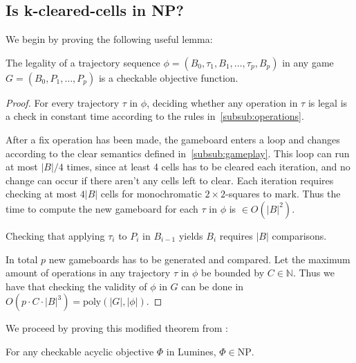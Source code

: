 \subsection{Is k-cleared-cells in NP?}

We begin by proving the following useful lemma:\\

\begin{lem}
\label{lem:legality}
The legality of a trajectory sequence $\phi=(B_0, \tau_1, B_1, \ldots ,\tau_p, B_p)$ in any game $G=(B_0, P_1, \ldots, P_p)$ is a checkable objective function.
\end{lem}

\begin{proof}
For every trajectory $\tau$ in $\phi$, deciding whether any operation in $\tau$ is legal is a check in constant time according to the rules in~\ref{subsub:operations}.

After a fix operation has been made, the gameboard enters a loop and changes according to the clear semantics defined in~\ref{subsub:gameplay}. This loop can run at most $|B| / 4$ times, since at least 4 cells has to be cleared each iteration, and no change can occur if there aren't any cells left to clear. Each iteration requires checking at most $4|B|$ cells for monochromatic $2 \times 2$-squares to mark. Thus the time to compute the new gameboard for each $\tau$ in $\phi$ is $\in O(|B|^2)$.

Checking that applying $\tau_i$ to $P_i$ in $B_{i-1}$ yields $B_i$ requires $|B|$ comparisons. 

In total $p$ new gameboards has to be generated and compared. Let the maximum amount of operations in any trajectory $\tau$ in $\phi$ be bounded by $C \in \mathbb{N}$. Thus we have that checking the validity of $\phi$ in $G$ can be done in $O(p \cdot C \cdot |B|^3) = \text{poly}(|G|, |\phi|)$. 
\end{proof}

We proceed by proving this modified theorem from \cite{tetris}: \\

\begin{thm}
\label{thm:npobj}
For any checkable acyclic objective $\Phi$ in Lumines, $\Phi \in \text{NP}$.
\end{thm}

